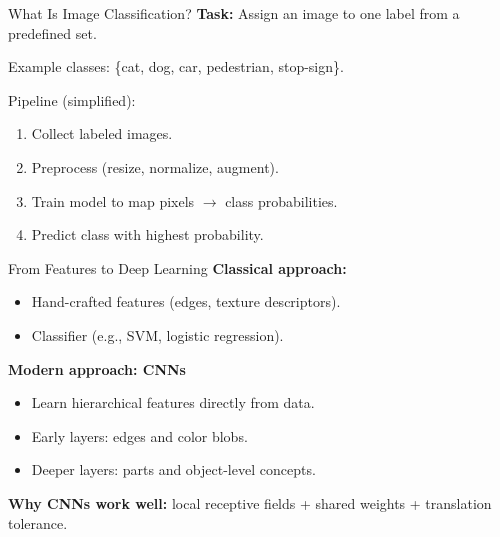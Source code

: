 \documentclass[10pt]{beamer}
\begin{document}
\begin{frame}{What Is Image Classification?}
    \textbf{Task:} Assign an image to one label from a predefined set.

    \vspace{0.2cm}
    Example classes: \{cat, dog, car, pedestrian, stop-sign\}.

    \vspace{0.2cm}
    Pipeline (simplified):
    \begin{enumerate}
        \item Collect labeled images.
        \item Preprocess (resize, normalize, augment).
        \item Train model to map pixels $\to$ class probabilities.
        \item Predict class with highest probability.
    \end{enumerate}
\end{frame}

\begin{frame}{From Features to Deep Learning}
    \textbf{Classical approach:}
    \begin{itemize}
        \item Hand-crafted features (edges, texture descriptors).
        \item Classifier (e.g., SVM, logistic regression).
    \end{itemize}

    \vspace{0.2cm}
    \textbf{Modern approach: CNNs}
    \begin{itemize}
        \item Learn hierarchical features directly from data.
        \item Early layers: edges and color blobs.
        \item Deeper layers: parts and object-level concepts.
    \end{itemize}

    \vspace{0.2cm}
    \textbf{Why CNNs work well:} local receptive fields + shared weights + translation tolerance.
\end{frame}
\end{document}
